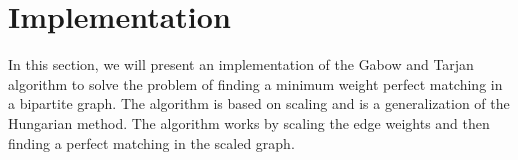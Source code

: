 \section{Implementation}

In this section, we will present an implementation of the Gabow and Tarjan algorithm to solve the problem of finding a minimum weight perfect matching in a bipartite graph. The algorithm is based on scaling and is a generalization of the Hungarian method. The algorithm works by scaling the edge weights and then finding a perfect matching in the scaled graph.
